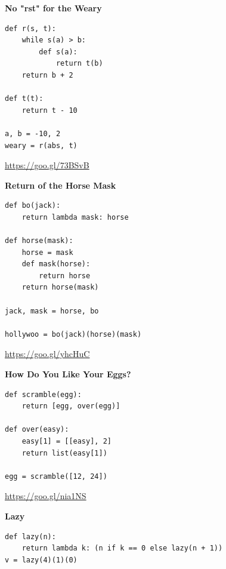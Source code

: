 \documentclass{exam}
\begin{document}
\begin{questions}
\item \textbf{No "rst" for the Weary}
\begin{lstlisting}
def r(s, t):
    while s(a) > b:
        def s(a):
            return t(b)
    return b + 2

def t(t):
    return t - 10

a, b = -10, 2
weary = r(abs, t)
\end{lstlisting}
\ifprintanswers\else
\fi

\begin{solution}
\url{https://goo.gl/73BSvB}
\end{solution}

\newpage

\item \textbf{Return of the Horse Mask}
\begin{lstlisting}
def bo(jack):
    return lambda mask: horse

def horse(mask):
    horse = mask
    def mask(horse):
        return horse
    return horse(mask)
    
jack, mask = horse, bo

hollywoo = bo(jack)(horse)(mask)
\end{lstlisting}
\ifprintanswers\else
\fi

\begin{solution}
\url{https://goo.gl/yhcHuC}
\end{solution}

\newpage

\item \textbf{How Do You Like Your Eggs?}
\begin{lstlisting}
def scramble(egg):
    return [egg, over(egg)]
    
def over(easy):
    easy[1] = [[easy], 2]
    return list(easy[1])
    
egg = scramble([12, 24])
\end{lstlisting}
\ifprintanswers\else
\fi

\begin{solution}
\url{https://goo.gl/nia1NS}
\end{solution}

\newpage

\item \textbf{Lazy}
\begin{lstlisting}
def lazy(n):
    return lambda k: (n if k == 0 else lazy(n + 1))
v = lazy(4)(1)(0)
\end{lstlisting}
\ifprintanswers\else
\fi


\end{questions}
\end{document}
